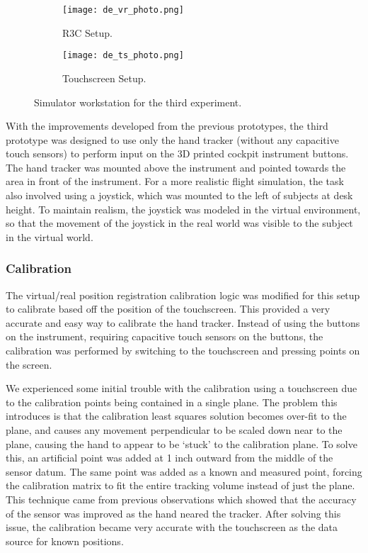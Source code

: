 \begin{figure}
    \centering
    \begin{subfigure}[t]{0.49\linewidth}
        \centering
        \texttt{[image: de\_vr\_photo.png]}
        \caption{R3C Setup.}
        \label{fig:proto_design_exp:vr}
    \end{subfigure}
    \begin{subfigure}[t]{0.49\linewidth}
        \centering
        \texttt{[image: de\_ts\_photo.png]}
        \caption{Touchscreen Setup.}
        \label{fig:proto_design_exp:ts}
    \end{subfigure}
    \caption{Simulator workstation for the third experiment.}
    \label{fig:proto_design_exp}
\end{figure}

With the improvements developed from the previous prototypes, the third prototype was designed to use only the hand tracker (without any capacitive touch sensors) to perform input on the 3D printed cockpit instrument buttons.
The hand tracker was mounted above the instrument and pointed towards the area in front of the instrument.
For a more realistic flight simulation, the task also involved using a joystick, which was mounted to the left of subjects at desk height.
To maintain realism, the joystick was modeled in the virtual environment, so that the movement of the joystick in the real world was visible to the subject in the virtual world.

\subsubsection{Calibration}

The virtual/real position registration calibration logic was modified for this setup to calibrate based off the position of the touchscreen.
This provided a very accurate and easy way to calibrate the hand tracker.
Instead of using the buttons on the instrument, requiring capacitive touch sensors on the buttons, the calibration was performed by switching to the touchscreen and pressing points on the screen.

We experienced some initial trouble with the calibration using a touchscreen due to the calibration points being contained in a single plane.
The problem this introduces is that the calibration least squares solution becomes over-fit to the plane, and causes any movement perpendicular to be scaled down near to the plane, causing the hand to appear to be `stuck' to the calibration plane.
To solve this, an artificial point was added at 1 inch outward from the middle of the sensor datum.
The same point was added as a known and measured point, forcing the calibration matrix to fit the entire tracking volume instead of just the plane.
This technique came from previous observations which showed that the accuracy of the sensor was improved as the hand neared the tracker.
After solving this issue, the calibration became very accurate with the touchscreen as the data source for known positions.

